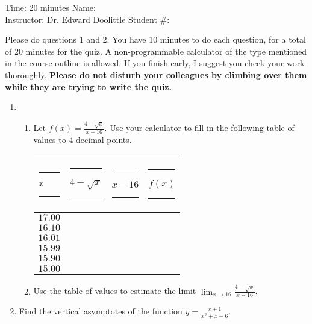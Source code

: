 \documentclass[12pt]{article}
\newcommand{\ds}{\displaystyle}
\begin{document}
\thispagestyle{plain}

\begin{flushleft}
Time:  20 minutes                \hfill       Name: \underline{\hspace{2in}} \\
Instructor: Dr. Edward Doolittle \hfill Student \#: \underline{\hspace{2in}}
\end{flushleft}

\noindent
Please do questions 1 and 2.  You have 10 minutes
to do each question, for a total of 20
minutes for the quiz.  A non-programmable
calculator of the type mentioned in the course outline is allowed.
If you finish early, I suggest you check your work thoroughly.
\textbf{Please do not disturb your colleagues by climbing over them while
they are trying to write the quiz.}

\begin{enumerate}
\item 
  \begin{enumerate}
  \item Let
    $\ds f(x)=\frac{4-\sqrt{x}}{x-16}$.
    Use your calculator to 
    fill in the following table of values to 4 decimal points.
    \begin{center}
      \begin{tabular}{|l|l|l|l|}
        \hline
	\rule{10pt}{0pt}$x$\rule{10pt}{0pt}     
	  & \rule{10pt}{0pt}\rule{0pt}{12pt}$4-\sqrt{x}$\rule{10pt}{0pt}
	  & \rule{10pt}{0pt}$x-16$\rule{10pt}{0pt}
	  & \rule{20pt}{0pt}$f(x)$\rule{20pt}{0pt} \\
	\hline
	\rule{0pt}{12pt}$17.00$ &              &        &        \\
	\hline
	\rule{0pt}{12pt}$16.10$ &              &        &        \\
	\hline
	\rule{0pt}{12pt}$16.01$ &              &        &        \\
	\hline
	\rule{0pt}{12pt}$15.99$ &              &        &        \\
	\hline
	\rule{0pt}{12pt}$15.90$ &              &        &        \\
	\hline
	\rule{0pt}{12pt}$15.00$ &              &        &        \\
	\hline
      \end{tabular}
    \end{center}
  \item Use the table of values to estimate the limit
    $\displaystyle\lim_{x\to 16} \frac{4-\sqrt{x}}{x-16}$.
  \end{enumerate}
\newpage
\item Find the vertical asymptotes of the function
  $\displaystyle y = \frac{x+1}{x^2+x-6}$.
\end{enumerate}
\end{document}
